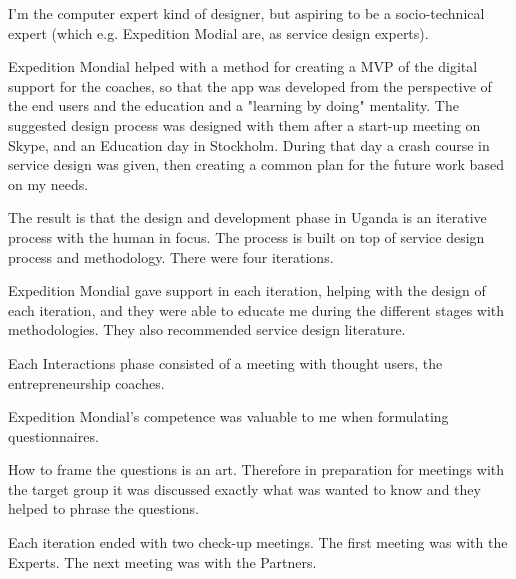 


I'm the computer expert kind of designer, but aspiring to be a socio-technical expert (which e.g. Expedition Modial are, as service design experts).

Expedition Mondial helped with a method for creating a MVP of the digital support for the coaches, so that the app was developed from the perspective of the end users and the education and a "learning by doing" mentality. The suggested design process was designed with them after a start-up meeting on Skype, and an Education day in Stockholm. During that day a crash course in service design was given, then creating a common plan for the future work based on my needs.

The result is that the design and development phase in Uganda is an iterative process with the human in focus. The process is built on top of service design process and methodology. There were four iterations.

Expedition Mondial gave support in each iteration, helping with the design of each iteration, and they were able to educate me during the different stages with methodologies. They also recommended service design literature.

Each Interactions phase consisted of a meeting with thought users, the entrepreneurship coaches.

Expedition Mondial's competence was valuable to me when formulating questionnaires.

How to frame the questions is an art.  Therefore in preparation for meetings with the target group it was discussed exactly what was wanted to know and they helped to phrase the questions.

Each iteration ended with two check-up meetings. The first meeting was with the Experts. The next meeting was with the Partners.

